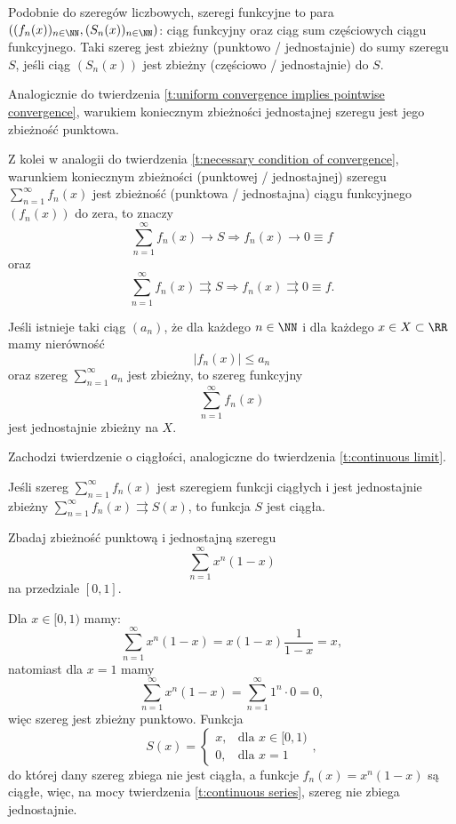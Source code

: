 Podobnie do szeregów liczbowych, szeregi funkcyjne to para $((f_n(x))_{n\in\NN}, (S_n(x))_{n\in\NN})$: ciąg funkcyjny oraz ciąg sum częściowych ciągu funkcyjnego. Taki szereg jest zbieżny (punktowo / jednostajnie) do sumy szeregu $S$, jeśli ciąg $(S_n(x))$ jest zbieżny (częściowo / jednostajnie) do $S$.

Analogicznie do twierdzenia \ref{t:uniform convergence implies pointwise convergence}, warukiem koniecznym zbieżności jednostajnej szeregu jest jego zbieżność punktowa.

Z kolei w analogii do twierdzenia \ref{t:necessary condition of convergence}, warunkiem koniecznym zbieżności (punktowej / jednostajnej) szeregu $\sum_{n=1}^\infty f_n(x)$ jest zbieżność (punktowa / jednostajna) ciągu funkcyjnego $(f_n(x))$ do zera, to znaczy
\[ \sum_{n=1}^\infty f_n(x) \rightarrow S \Longrightarrow f_n(x) \rightarrow 0 \equiv f \]
oraz
\[ \sum_{n=1}^\infty f_n(x) \rightrightarrows S \Longrightarrow f_n(x) \rightrightarrows 0 \equiv f. \]

\begin{theorem}
    Jeśli istnieje taki ciąg $(a_n)$, że dla każdego $n \in \NN$ i dla każdego $x \in X \subset \RR$ mamy nierówność
    \[ |f_n(x)| \leq a_n \]
    oraz szereg $\sum_{n=1}^\infty a_n$ jest zbieżny, to szereg funkcyjny
    \[ \sum_{n=1}^\infty f_n(x) \]
    jest jednostajnie zbieżny na $X$.
\end{theorem}

Zachodzi twierdzenie o ciągłości, analogiczne do twierdzenia \ref{t:continuous limit}.

\begin{theorem}
    \label{t:continuous series}
    Jeśli szereg $\sum_{n=1}^\infty f_n(x)$ jest szeregiem funkcji ciągłych i jest jednostajnie zbieżny $\sum_{n=1}^\infty f_n(x) \rightrightarrows S(x)$, to funkcja $S$ jest ciągła.
\end{theorem}

\begin{example}
    Zbadaj zbieżność punktową i jednostajną szeregu
    \[ \sum_{n=1}^\infty x^n(1-x) \]
    na przedziale $[0,1]$.
\end{example}
\begin{solution}
    Dla $x \in [0, 1)$ mamy:
    \[ \sum_{n=1}^\infty x^n(1-x) = x(1-x)\frac{1}{1-x} = x, \]
    natomiast dla $x = 1$ mamy
    \[ \sum_{n=1}^\infty x^n(1-x) = \sum_{n=1}^\infty 1^n \cdot 0 = 0, \]
    więc szereg jest zbieżny punktowo. Funkcja
    \[ S(x) = \begin{cases}x, & \text{dla } x \in [0, 1) \\ 0, & \text{dla } x = 1 \end{cases}, \]
    do której dany szereg zbiega nie jest ciągła, a funkcje $f_n(x) = x^n(1-x)$ są ciągłe, więc, na mocy twierdzenia \ref{t:continuous series}, szereg nie zbiega jednostajnie.
\end{solution}

